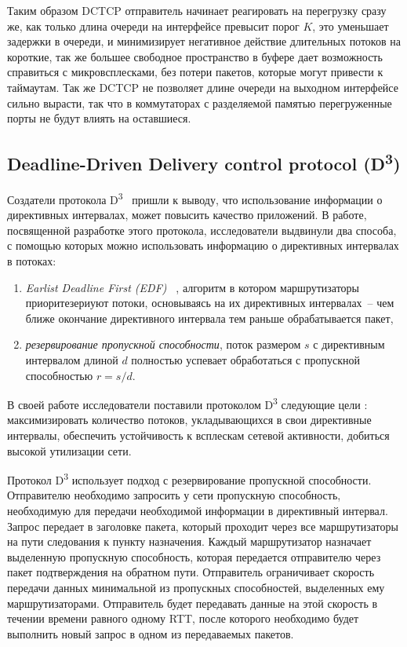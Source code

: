 \documentclass[14pt, a4paper,oneside]{extarticle}
\begin{document}
Таким  образом DCTCP отправитель начинает реагировать на перегрузку сразу же, как только длина очереди на интерфейсе превысит порог $K$, это уменьшает задержки в очереди, и минимизирует негативное действие длительных потоков на короткие, так же большее свободное пространство в буфере дает возможность справиться с микровсплесками, без потери пакетов, которые могут привести к таймаутам. Так же DCTCP не позволяет длине очереди на выходном интерфейсе сильно вырасти, так что в коммутаторах с разделяемой памятью перегруженные порты не будут влиять на оставшиеся. 

\subsection{Deadline-Driven Delivery control protocol (D\textsuperscript{3})}

Создатели протокола D\textsuperscript{3}~\cite{d3tcp} пришли к выводу, что использование информации о директивных интервалах, может повысить качество приложений. В работе, посвященной разработке этого протокола, исследователи выдвинули два способа, с помощью которых можно использовать информацию о директивных интервалах в потоках:
\begin{enumerate}
\item \emph{ Earlist Deadline First (EDF)~\cite{edf} }, алгоритм в котором маршрутизаторы приоритезериуют потоки, основываясь на их директивных интервалах~-- чем ближе окончание директивного интервала тем раньше обрабатывается пакет,
\item \emph{резервирование пропускной способности}, поток размером $s$ с директивным интервалом длиной $d$ полностью успевает обработаться с пропускной способностью $r = s/d$.
\end{enumerate} 

В своей работе исследователи поставили протоколом D\textsuperscript{3} следующие цели : максимизировать количество потоков, укладывающихся в свои директивные интервалы, обеспечить устойчивость к всплескам сетевой активности, добиться высокой утилизации сети.

Протокол D\textsuperscript{3} использует подход с резервирование пропускной способности. Отправителю необходимо запросить у сети пропускную способность, необходимую для передачи необходимой информации в директивный интервал. Запрос передает в заголовке пакета, который проходит через все маршрутизаторы на пути следования к пункту назначения. Каждый маршрутизатор назначает выделенную пропускную способность, которая передается отправителю через пакет подтверждения на обратном пути. Отправитель ограничивает скорость передачи данных минимальной из пропускных способностей, выделенных ему маршрутизаторами. Отправитель будет передавать данные на этой скорость в течении времени равного одному RTT, после которого необходимо будет выполнить новый запрос в одном из передаваемых пакетов.
\end{document}
